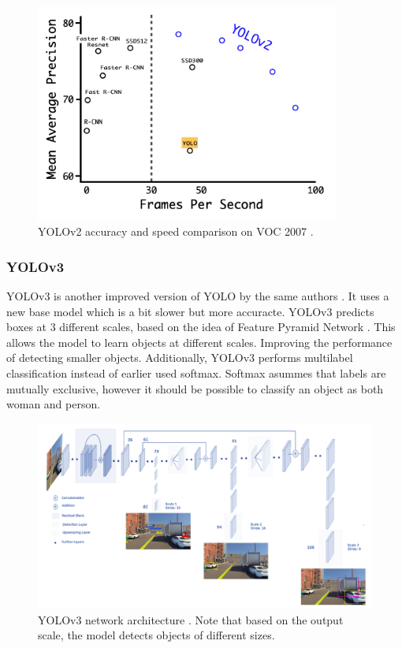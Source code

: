 \begin{figure}[ht]
\begin{center}
\includegraphics[width=10cm,keepaspectratio]{images/2_literature/yolov2-performance.png}
\end{center}
\caption{YOLOv2 accuracy and speed comparison on VOC 2007 \cite{Redmon2017}.}
\end{figure}

\subsubsection{YOLOv3}
YOLOv3 is another improved version of YOLO by the same authors \cite{Redmon2018}. It uses a new base model which is a bit slower but more accuracte. YOLOv3 predicts boxes at 3 different scales, based on the idea of Feature Pyramid Network \cite{Lin2017}. This allows the model to learn objects at different scales. Improving the performance of detecting smaller objects. Additionally, YOLOv3 performs multilabel classification instead of earlier used softmax.  Softmax asummes that labels are mutually exclusive, however it should be possible to classify an object as both woman and person. 


\begin{figure}[ht]
\begin{center}
\includegraphics[width=14cm,keepaspectratio]{images/2_literature/yolov3-architecture.png}
\end{center}
\caption{YOLOv3 network architecture \cite{Dulepet2020}. Note that based on the output scale, the model detects objects of different sizes.}
\end{figure}


